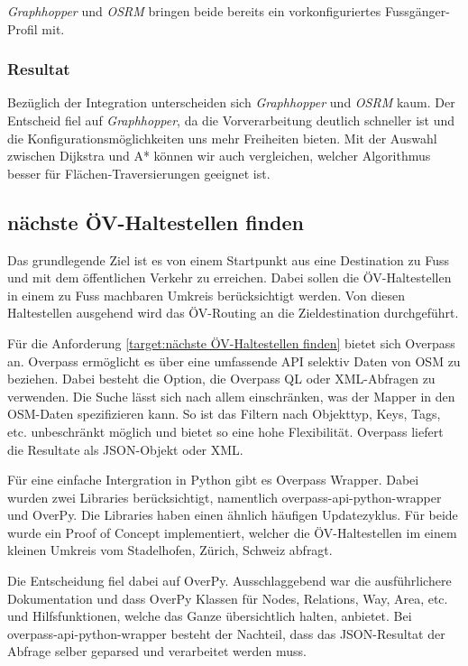 \emph{Graphhopper} und \emph{OSRM} bringen beide bereits ein vorkonfiguriertes Fussgänger-Profil mit.

\subsubsection{Resultat}
\label{analyse:Resulat}
Bezüglich der Integration unterscheiden sich \emph{Graphhopper} und \emph{OSRM} kaum. Der Entscheid fiel auf \emph{Graphhopper}, da die Vorverarbeitung deutlich schneller ist und die Konfigurationsmöglichkeiten uns mehr Freiheiten bieten. Mit der Auswahl zwischen Dijkstra \cite{dijkstra_algorithm} und A* \cite{astar} können wir auch vergleichen, welcher Algorithmus besser für Flächen-Traversierungen geeignet ist.


\subsection{nächste ÖV-Haltestellen finden}
\label{analyse:nächste ÖV-Haltestellen finden}

Das grundlegende Ziel ist es von einem Startpunkt aus eine Destination zu Fuss und mit dem öffentlichen Verkehr zu erreichen. Dabei sollen die ÖV-Haltestellen in einem zu Fuss machbaren Umkreis berücksichtigt werden. Von diesen Haltestellen ausgehend wird das ÖV-Routing an die Zieldestination durchgeführt.

Für die Anforderung \ref{target:nächste ÖV-Haltestellen finden} bietet sich Overpass an. Overpass ermöglicht es über eine umfassende \ac{API} selektiv Daten von \ac{OSM} zu beziehen. Dabei besteht die Option, die Overpass \ac{QL} oder XML-Abfragen zu verwenden. Die Suche lässt sich nach allem einschränken, was der Mapper in den \ac{OSM}-Daten spezifizieren kann. So ist das Filtern nach Objekttyp, Keys, Tags, etc. unbeschränkt möglich und bietet so eine hohe Flexibilität. Overpass liefert die Resultate als JSON-Objekt oder XML. 

Für eine einfache Intergration in Python gibt es Overpass Wrapper. Dabei wurden zwei Libraries berücksichtigt, namentlich overpass-api-python-wrapper und OverPy. Die Libraries haben einen ähnlich häufigen Updatezyklus. Für beide wurde ein Proof of Concept implementiert, welcher die ÖV-Haltestellen im einem kleinen Umkreis vom Stadelhofen, Zürich, Schweiz abfragt.

Die Entscheidung fiel dabei auf OverPy. Ausschlaggebend war die ausführlichere Dokumentation und dass OverPy Klassen für Nodes, Relations, Way, Area, etc. und Hilfsfunktionen, welche das Ganze übersichtlich halten, anbietet. Bei overpass-api-python-wrapper besteht der Nachteil, dass das JSON-Resultat der Abfrage selber geparsed und verarbeitet werden muss.

